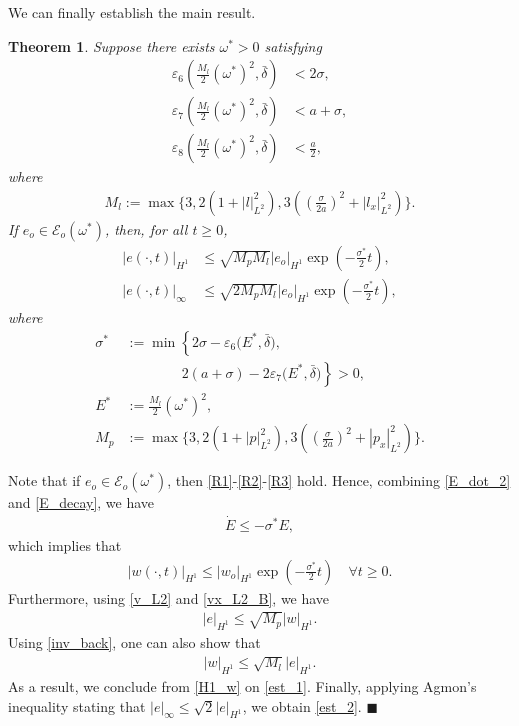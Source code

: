 \documentclass[twocolumn]{autart}
\newtheorem{thmm}{Theorem}
\newenvironment{theorem}{\begin{thmm}}{\hfill   \end{thmm}}
\newenvironment{proof}{{\it Proof. }}{\hfill $\blacksquare$ }
\begin{document}
We can finally establish the main result. 

\begin{theorem}\label{estimates}
Suppose there exists $\omega^*>0$ satisfying
\begin{align}
\varepsilon_6\left(\frac{M_l}{2}(\omega^*)^2,\bar{\delta}\right) &< 2\sigma, \label{omega_cond_1}\\
\varepsilon_7\left(\frac{M_l}{2}(\omega^*)^2,\bar{\delta}\right) &< a+\sigma, \label{omega_cond_2}\\
\varepsilon_8\left(\frac{M_l}{2}(\omega^*)^2,\bar{\delta}\right) &< \frac{a}{2},\label{omega_cond_3}
\end{align}
where 
\begin{align*}
M_l := \max\bigg\{3,2\left(1+|l|_{L^2}^2\right),3\left(\left(\frac{\sigma}{2a}\right)^2+|l_x|_{L^2}^2\right)\bigg\}.
\end{align*}
If $e_o\in \mathscr{E}_o(\omega^*)$, then, for all $t\geq 0$,
\begin{align}
|e(\cdot,t)|_{H^1} &\leq \sqrt{M_pM_l}|e_o|_{H^1}\exp\left(-\frac{\sigma^*}{2}t\right), \label{est_1} \\
|e(\cdot,t)|_{\infty} &\leq \sqrt{2M_pM_l}|e_o|_{H^1}\exp\left(-\frac{\sigma^*}{2}t\right), \label{est_2}
\end{align}
where
\begin{align}
\sigma^*&:=\min\left\{2\sigma-\varepsilon_6\big(E^*,\bar{\delta}\big),\right. \nonumber \\
&\left.\qquad \qquad 2(a+\sigma)-2\varepsilon_7\big(E^*,\bar{\delta}\big)\right\}>0, \label{conv_rate}\\
E^* &:= \frac{M_l}{2}(\omega^*)^2, \nonumber \\
M_p &:= \max\bigg\{3,2\left(1+|p|_{L^2}^2\right),3\left(\left(\frac{\sigma}{2a}\right)^2+|p_x|_{L^2}^2\right)\bigg\}. \nonumber 
\end{align}
\end{theorem}
\begin{proof}
Note that if $e_o\in \mathscr{E}_o(\omega^*)$, then \eqref{R1}-\eqref{R2}-\eqref{R3} hold. Hence, combining \eqref{E_dot_2} and \eqref{E_decay}, we have 
\begin{align}
\dot{E} \leq - \sigma^* E, 
\end{align}
which implies that 
\begin{align}
|w(\cdot,t)|_{H^1} \leq |w_o|_{H^1}\exp\left(-\frac{\sigma^*}{2}t\right) \quad \forall t\geq 0. \label{H1_w}
\end{align}
Furthermore, using \eqref{v_L2} and \eqref{vx_L2_B}, we have 
\begin{align}
|e|_{H^1} \leq \sqrt{M_p}|w|_{H^1}.
\end{align}
Using \eqref{inv_back}, one can also show that 
\begin{align}
|w|_{H^1} \leq \sqrt{M_l}|e|_{H^1}.
\end{align}
As a result, we conclude from \eqref{H1_w} on \eqref{est_1}. 
Finally, applying Agmon's inequality stating that $|e|_{\infty}\leq \sqrt{2}|e|_{H^1}$, we obtain \eqref{est_2}.
\end{proof}
\end{document}
